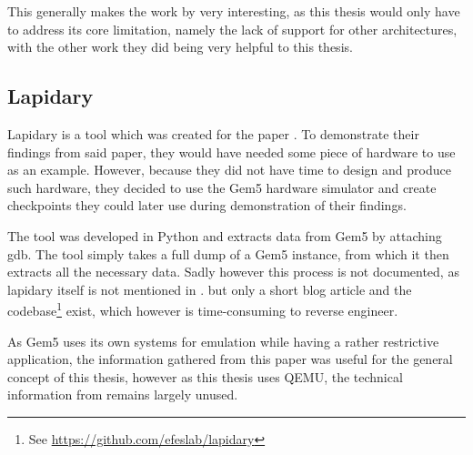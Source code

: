 This generally makes the work by \citeauthor{qpoints} very interesting,
as this thesis would only have to address its core limitation,
namely the lack of support for other architectures,
with the other work they did being very helpful to this thesis.

\subsection{Lapidary\cite{lapidary}}
Lapidary is a tool which was created for the paper .
To demonstrate their findings from said paper,
they would have needed some piece of hardware to use as an example.
However, because they did not have time to design and produce such hardware,
they decided to use the Gem5 hardware simulator\cite{gem5} and create checkpoints
they could later use during demonstration of their findings\cite{lapidary_story}.

The tool was developed in Python and extracts data from Gem5 by attaching gdb.
The tool simply takes a full dump of a Gem5 instance,
from which it then extracts all the necessary data.
Sadly however this process is not documented,
as lapidary itself is not mentioned in .
but only a short blog article\cite{lapidary_story}
and the codebase\footnote{See \url{https://github.com/efeslab/lapidary}} exist, which however is time-consuming to reverse engineer.

As Gem5 uses its own systems for emulation
while having a rather restrictive application,
the information gathered from this paper was useful for the general concept of this thesis,
however as this thesis uses QEMU, the technical information from \citeauthor{lapidary} remains largely unused.